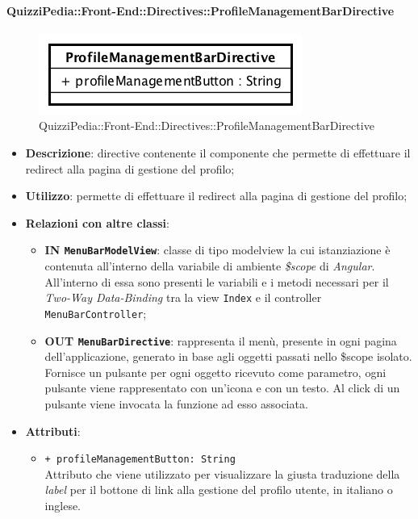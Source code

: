 \paragraph[QuizziPedia::Front-End::Directives\\::ProfileManagementBarDirective]{QuizziPedia::Front-End::Directives::ProfileManagementBarDirective}
\label{QuizziPedia::Front-End::Directives::ProfileManagementBarDirective}
\begin{figure} [ht]
	\centering
	\includegraphics[scale=0.80]{UML/Classi/Front-End/QuizziPedia_Front-end_Directives_ProfileManagementBarDirective.png}
	\caption{QuizziPedia::Front-End::Directives::ProfileManagementBarDirective}
\end{figure} \FloatBarrier
\begin{itemize}
	\item \textbf{Descrizione}: directive contenente il componente che permette di effettuare il redirect alla pagina di gestione del profilo;
	\item \textbf{Utilizzo}: permette di effettuare il redirect alla pagina di gestione del profilo;
	\item \textbf{Relazioni con altre classi}:
	\begin{itemize}
		\item \textbf{IN \texttt{MenuBarModelView}}: classe di tipo modelview la cui istanziazione è contenuta all'interno della variabile di ambiente \textit{\$scope} di \textit{Angular}. All'interno di essa sono presenti le variabili e i metodi necessari per il \textit{Two-Way Data-Binding} tra la view \texttt{Index} e il controller \texttt{MenuBarController};
		\item \textbf{OUT \texttt{MenuBarDirective}}: rappresenta il menù, presente in ogni pagina dell'applicazione, generato in base agli oggetti passati nello \$scope isolato. Fornisce un pulsante per ogni oggetto ricevuto come parametro, ogni pulsante viene rappresentato con un’icona e con un testo. Al click di un pulsante viene invocata la funzione ad esso associata.  
	\end{itemize}
	\item \textbf{Attributi}:
	\begin{itemize}
		\item \texttt{+ profileManagementButton: String} \\ Attributo che viene utilizzato per visualizzare la giusta traduzione della \textit{label} per il bottone di link alla gestione del profilo utente, in italiano o inglese.
	\end{itemize}
\end{itemize}